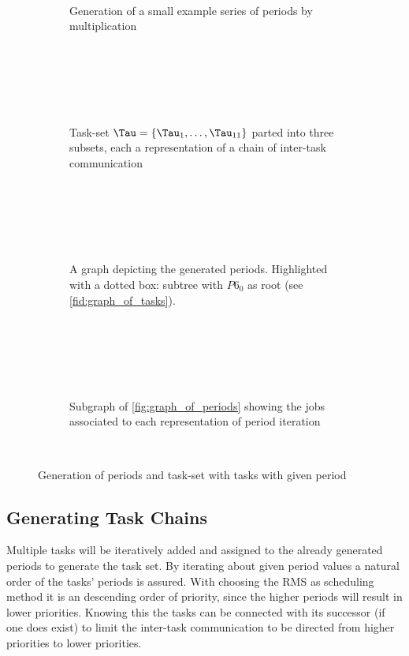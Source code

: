 \begin{figure}[ht]
    \begin{subfigure}[c]{0.45\textwidth}
        \resizebox{\textwidth}{!}{%
            \label{fig:chain_of_periods}
        
 }
        \caption{Generation of a small example series of periods by multiplication}
    \end{subfigure}
    \hfill
    \begin{subfigure}[c]{0.45\textwidth}
        \resizebox{\textwidth}{!}{%
            \label{fig:chain_of_tasks}
            
 }
        \caption{Task-set $\Tau=\{\Tau_{1}, \ldots, \Tau_{11}\}$ parted into three subsets, each a representation of a chain of inter-task communication}
    \end{subfigure}
    \begin{subfigure}[c]{0.450\textwidth}
        \resizebox{\textwidth}{!}{%
            \label{fig:graph_of_periods}
            
 }
        \caption{A graph depicting the generated periods. Highlighted with a dotted box: subtree with $P6_0$ as root (see \cref{fid:graph_of_tasks}).}
    \end{subfigure}
    \hfill
    \begin{subfigure}[c]{0.45\textwidth}
        \resizebox{\textwidth}{!}{%
            \label{fig:graph_of_tasks}
            
 }
        \caption{Subgraph of \cref{fig:graph_of_periods} showing the jobs associated to each representation of period iteration}
    \end{subfigure}
    \caption{Generation of periods and task-set with tasks with given period}\label{fig:graph}
\end{figure}

\subsection{Generating Task Chains}\label{sec:concept_task_chains}
Multiple tasks will be iteratively added and assigned to the already generated periods to generate the task set.
By iterating about given period values a natural order of the tasks' periods is assured.
With choosing the \ac{RMS} as scheduling method it is an descending order of priority, since the higher periods will result in lower priorities.
Knowing this the tasks can be connected with its successor (if one does exist) to limit the inter-task communication to be directed from higher priorities to lower priorities.

